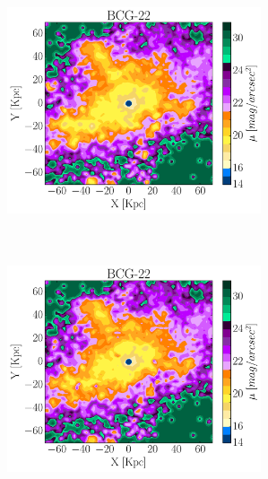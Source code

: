 \begin{figure}[H]
 \centering
 \includegraphics[height=7.5cm, width=7.5cm,trim={0cm   0.1cm 3.5cm 1.cm},clip ]{../al_final/LR/LR_minpot3_rmmax/nodust/grupo0/mu24/D22/026/maps_D22.pdf}
 \includegraphics[height=7.5cm, width=7.5cm,trim={2.8cm 0.1cm 0.3cm 1.cm},clip ]{../al_final/LR/LR_minpot3_rmmax/dust/grupo0/mu24/D22/026/maps_D22.pdf}
\end{figure}

